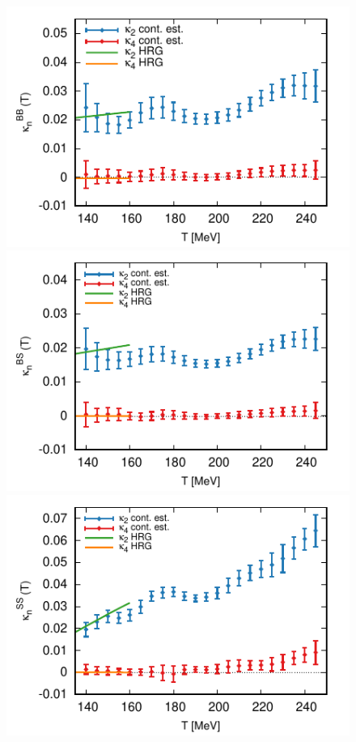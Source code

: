 \documentclass[aps,prd,twocolumn,superscriptaddress]{revtex4-2}
\begin{document}
\begin{figure}[!]
\includegraphics[width=\linewidth]{figures/final_kappaNB2_paper.pdf}
\includegraphics[width=\linewidth]{figures/final_kappaNBS_paper.pdf}
\includegraphics[width=\linewidth]{figures/final_kappaNS2_paper.pdf}

\end{figure}
\end{document}
